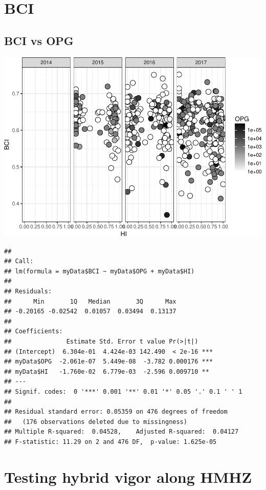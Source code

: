 \documentclass[]{article}
\begin{document}
\section{BCI}\label{bci-1}

\subsection{BCI vs OPG}\label{bci-vs-opg-1}

\includegraphics{Data_Analysis_Alice_files/figure-latex/BCI_3.75-1.pdf}

\begin{verbatim}
## 
## Call:
## lm(formula = myData$BCI ~ myData$OPG + myData$HI)
## 
## Residuals:
##      Min       1Q   Median       3Q      Max 
## -0.20165 -0.02542  0.01057  0.03494  0.13137 
## 
## Coefficients:
##               Estimate Std. Error t value Pr(>|t|)    
## (Intercept)  6.304e-01  4.424e-03 142.490  < 2e-16 ***
## myData$OPG  -2.061e-07  5.449e-08  -3.782 0.000176 ***
## myData$HI   -1.760e-02  6.779e-03  -2.596 0.009710 ** 
## ---
## Signif. codes:  0 '***' 0.001 '**' 0.01 '*' 0.05 '.' 0.1 ' ' 1
## 
## Residual standard error: 0.05359 on 476 degrees of freedom
##   (176 observations deleted due to missingness)
## Multiple R-squared:  0.04528,    Adjusted R-squared:  0.04127 
## F-statistic: 11.29 on 2 and 476 DF,  p-value: 1.625e-05
\end{verbatim}

\section{Testing hybrid vigor along
HMHZ}\label{testing-hybrid-vigor-along-hmhz-1}
\end{document}
